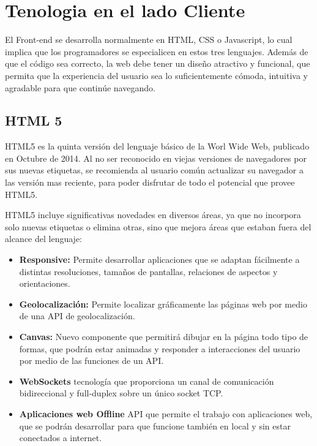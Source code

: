 \section{Tenologia en el lado Cliente}

El Front-end se desarrolla normalmente en HTML, CSS o Javascript, lo cual implica que los programadores se especialicen en estos tres lenguajes. Además de que el código sea correcto, la web debe tener un diseño atractivo y funcional, que permita que la experiencia del usuario sea lo suficientemente cómoda, intuitiva y agradable para que continúe navegando. 

\subsection*{HTML 5}
HTML5 es la quinta versión del lenguaje básico de la Worl Wide Web, publicado en Octubre de 2014. Al no ser reconocido en viejas versiones de navegadores por sus nuevas etiquetas, se recomienda al usuario común actualizar su navegador a las versión mas reciente, para poder disfrutar de todo el potencial que provee HTML5.

HTML5 incluye significativas novedades en diversos áreas, ya que no incorpora solo nuevas etiquetas o elimina otras, sino que mejora áreas que estaban fuera del alcance del lenguaje:

\begin{itemize}
    \item \textbf{Responsive: } Permite desarrollar aplicaciones que se adaptan fácilmente a distintas resoluciones, tamaños de pantallas, relaciones de aspectos y orientaciones.
    \item \textbf{Geolocalización: }Permite localizar gráficamente las páginas web por medio de una API de geolocalización.
    \item \textbf{Canvas: } Nuevo componente que permitirá dibujar en la página todo tipo de formas, que podrán estar animadas y responder a interacciones del usuario por medio de las funciones de un API. 
    \item \textbf{WebSockets } tecnología que proporciona un canal de comunicación bidireccional y full-duplex sobre un único socket TCP. 
    \item \textbf{Aplicaciones web Offline } API que permite el trabajo con aplicaciones web, que se podrán desarrollar para que funcione también en local y sin estar conectados a internet.
    
    
\end{itemize}

